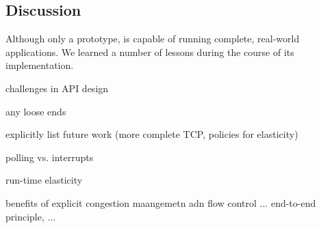 \subsection{Discussion}
\label{sec:impl:discussion}

Although only a prototype, \ix is capable of running complete,
real-world applications.  We learned a number of lessons during the
course of its implementation.

\todo challenges in API design

\todo any loose ends

\todo explicitly list future work (more complete TCP, policies for elasticity)

\todo polling vs. interrupts

\todo run-time elasticity

\todo benefits of explicit congestion maangemetn adn flow control ... end-to-end principle, ... 

